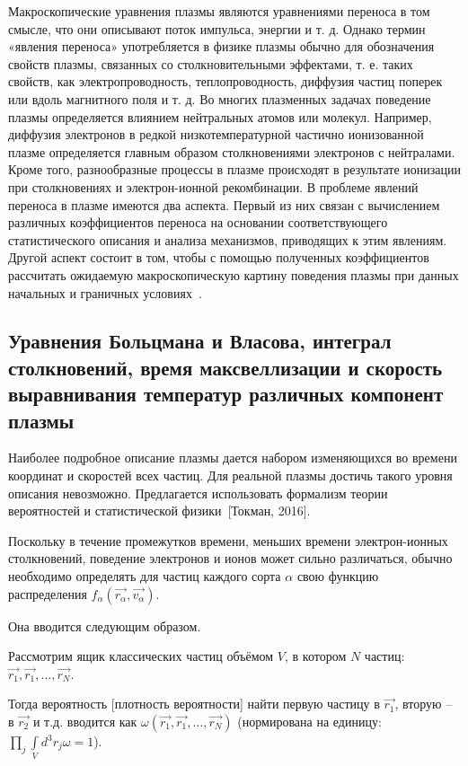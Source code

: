 \documentclass[10pt, a4paper]{article}
\numberwithin{equation}{section}
\newcommand{\Tokman}{~[Токман, 2016]}
\begin{document}
Макроскопические уравнения плазмы являются уравнениями переноса в том смысле, что они описывают поток импульса, энергии и т. д. Однако термин «явления переноса» употребляется в физике плазмы обычно для обозначения свойств плазмы, связанных со столкновительными эффектами, т. е. таких свойств, как электропроводность, теплопроводность, диффузия частиц поперек или вдоль магнитного поля и т. д. Во многих плазменных задачах поведение плазмы определяется влиянием нейтральных атомов или молекул. Например, диффузия электронов в редкой низкотемпературной частично ионизованной плазме определяется главным образом  столкновениями электронов с нейтралами. Кроме того, разнообразные процессы в  плазме происходят в результате ионизации при столкновениях и  электрон-ионной рекомбинации. В проблеме явлений переноса в плазме имеются два аспекта. Первый из них связан с вычислением различных коэффициентов переноса на  основании соответствующего статистического описания и анализа механизмов, приводящих к этим явлениям. Другой аспект состоит в том, чтобы с помощью полученных коэффициентов рассчитать ожидаемую макроскопическую  картину поведения плазмы при данных начальных и граничных условиях~\cite{kroll}.

\subsection{Уравнения Больцмана и Власова, интеграл столкновений, время максвеллизации и скорость выравнивания температур различных компонент плазмы}

Наиболее подробное описание плазмы дается набором изменяющихся во времени координат и скоростей всех частиц. Для реальной плазмы достичь такого уровня описания невозможно. Предлагается использовать формализм теории вероятностей и статистической физики\Tokman.

Поскольку в течение промежутков времени, меньших времени электрон-ионных столкновений, поведение электронов и ионов может сильно  различаться, обычно необходимо определять для частиц каждого сорта $\alpha$ свою функцию распределения $f_\alpha(\vec{r_\alpha}, \vec{v_\alpha})$.

Она вводится следующим образом.

Рассмотрим ящик классических частиц объёмом $V$, в котором $N$ частиц: $\vec{r_1}, \vec{r_1},\ldots,\vec{r_N}$. 

Тогда вероятность [плотность вероятности] найти первую частицу в $\vec{r_1}$, вторую -- в $\vec{r_2}$ и т.д. вводится как $\omega(\vec{r_1}, \vec{r_1},\ldots,\vec{r_N})$ (нормирована на единицу: $\prod\limits_{j} \int\limits_{V} d^3r_j \omega = 1$).
\end{document}
